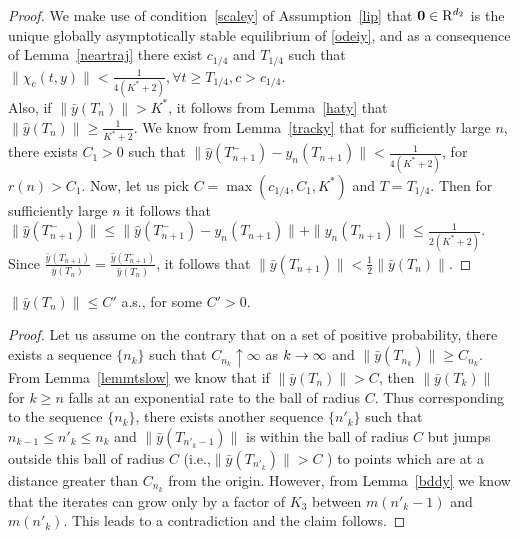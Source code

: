 \begin{proof}
We make use of condition~\ref{scaley} of Assumption~\ref{lip} that $\mathbf{0}\in \mathrm{R}^{d_2}$ is the unique globally asymptotically stable equilibrium of \eqref{odeiy}, and as a consequence of Lemma~\ref{neartraj} there exist $c_{1/4}$ and $T_{1/4}$ such that $\parallel \chi_c(t,y)\parallel <\frac{1}{4(K^*+2)}, 
\forall t\geq T_{1/4}, c>c_{1/4}$. \\
Also, if $\parallel \bar{y}(T_n)\parallel >K^*$, it follows from Lemma~\ref{haty} that 
$\parallel \hat{y}(T_n)\parallel \geq \frac{1}{K^*+2}$. We know from Lemma~\ref{tracky} that for 
sufficiently large $n$, there exists $C_1>0$ such that $\parallel \hat{y}(T^{-}_{n+1})-y_n(T_{n+1})\parallel
<\frac{1}{4(K^*+2)}$, for $r(n)>C_1$. Now, let us pick $C=\max(c_{1/4},C_1,K^*)$ and $T=T_{1/4}$. 
Then for sufficiently large $n$ it follows that $\parallel \hat{y}(T^{-}_{n+1})\parallel
\leq \parallel \hat{y}(T^{-}_{n+1})-y_n(T_{n+1})\parallel + \parallel y_n(T_{n+1})\parallel
\leq \frac{1}{2(K^*+2)}$. Since $\frac{\bar{y}(T_{n+1})}{\bar{y}(T_{n})}=
\frac{\hat{y}(T^{-}_{n+1})}{\hat{y}(T_{n})}$,  it follows that $\parallel
\bar{y}(T^{}_{n+1})\parallel <\frac{1}{2}\parallel \bar{y}(T_n)\parallel$.
\end{proof}

\begin{corollary}\label{cormts}
$\parallel \bar{y}(T_n)\parallel \leq C'$ a.s., for some $C'>0$.
\end{corollary}
\begin{proof}
Let us assume on the contrary that on a set of positive probability,
there exists a sequence $\{n_k\}$ such that $C_{n_k} \uparrow \infty$ as $k\rightarrow \infty$ and $\parallel
\bar{y}(T_{n_k})\parallel \geq C_{n_k}$. From Lemma~\ref{lemmtslow} we know that if $\parallel
\bar{y}(T_n)\parallel >C$, then $\parallel \bar{y}(T_k)\parallel$ for $k\geq n$ falls at an exponential 
rate to the ball of radius $C$. Thus corresponding to the sequence $\{n_k\}$, there exists another sequence 
$\{n'_k\}$ such that $n_{k-1}\leq n'_k\leq n_k$ and $\parallel \bar{y}(T_{n'_k-1})\parallel$ 
is within the ball of radius $C$  but jumps outside this ball of radius $C$ 
(i.e.,$\parallel \bar{y}(T_{n'_k})\parallel>C$ ) to points which are at a distance greater than 
$C_{n_k}$ from the origin. However, from Lemma~\ref{bddy} we know that the iterates can grow only by a 
factor of $K_3$ between $m(n'_k-1)$ and $m(n'_k)$. This leads to a contradiction and the claim
follows.
\end{proof}

